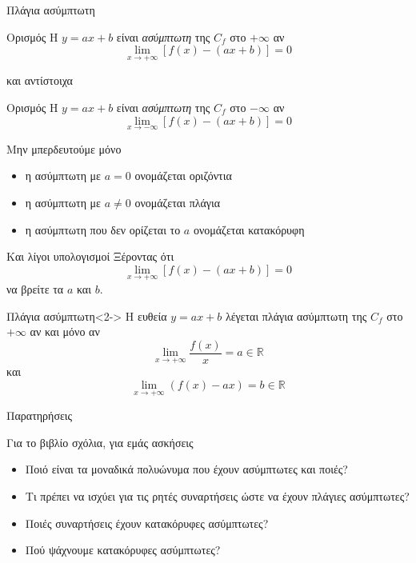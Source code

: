 \documentclass{presentation}
\begin{document}
\begin{frame}{Πλάγια ασύμπτωτη}
  \begin{block}{Ορισμός}
    Η $y=ax+b$ είναι \emph{ασύμπτωτη} της $C_f$ στο $+\infty$ αν $$\lim\limits_{x \to +\infty}{ [f(x)-(ax+b)] }=0$$
  \end{block}
  και αντίστοιχα
  \begin{block}{Ορισμός}
    Η $y=ax+b$ είναι \emph{ασύμπτωτη} της $C_f$ στο $-\infty$ αν $$\lim\limits_{x \to -\infty}{ [f(x)-(ax+b)] }=0$$
  \end{block}
\end{frame}

\begin{frame}{Μην μπερδευτούμε μόνο}
  \begin{itemize}
    \item<1-> η ασύμπτωτη με $a=0$ ονομάζεται οριζόντια
    \item<2-> η ασύμπτωτη με $a\ne 0$ ονομάζεται πλάγια
    \item<3-> η ασύμπτωτη που δεν ορίζεται το $a$ ονομάζεται κατακόρυφη
  \end{itemize}
\end{frame}

\begin{frame}{Και λίγοι υπολογισμοί}
  Ξέροντας ότι
  $$\lim\limits_{x \to +\infty}{ [f(x)-(ax+b)] }=0$$
  να βρείτε τα $a$ και $b$.
  \begin{block}{Πλάγια ασύμπτωτη}<2->
    Η ευθεία $y=ax+b$ λέγεται πλάγια ασύμπτωτη της $C_f$ στο $+\infty$ αν και μόνο αν
    $$\lim\limits_{x \to +\infty}{ \dfrac{f(x)}{x} }=a\in\mathbb{R}$$
    και
    $$\lim\limits_{x \to +\infty}{ (f(x)-ax) }=b\in\mathbb{R}$$
  \end{block}
\end{frame}

\begin{frame}{Παρατηρήσεις}

  Για το βιβλίο σχόλια, για εμάς ασκήσεις

  \begin{itemize}
    \item<1-> Ποιό είναι τα μοναδικά πολυώνυμα που έχουν ασύμπτωτες και ποιές?
    \item<2-> Τι πρέπει να ισχύει για τις ρητές συναρτήσεις ώστε να έχουν πλάγιες ασύμπτωτες?
    \item<3-> Ποιές συναρτήσεις έχουν κατακόρυφες ασύμπτωτες?
    \item<4-> Πού ψάχνουμε κατακόρυφες ασύμπτωτες?
  \end{itemize}

\end{frame}
\end{document}
